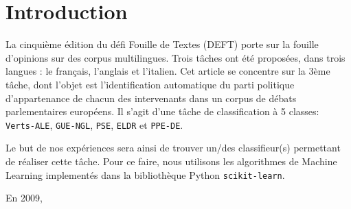 \section{Introduction}

\par La cinquième édition du défi Fouille de Textes (DEFT) porte sur la fouille d'opinions sur des corpus multilingues. Trois tâches ont été proposées, dans trois langues : le français, l'anglais et l'italien. Cet article se concentre sur la 3ème tâche, dont l'objet est l'identification automatique du parti politique d'appartenance de chacun des intervenants dans un corpus de débats parlementaires européens. Il s'agit d'une tâche de classification à 5 classes: \texttt{Verts-ALE}, \texttt{GUE-NGL}, \texttt{PSE}, \texttt{ELDR} et \texttt{PPE-DE}.

\par Le but de nos expériences sera ainsi de trouver un/des classifieur(s) permettant de réaliser cette tâche. Pour ce faire, nous utilisons les algorithmes de Machine Learning implementés dans la bibliothèque Python \texttt{scikit-learn}.

\par En 2009, 
